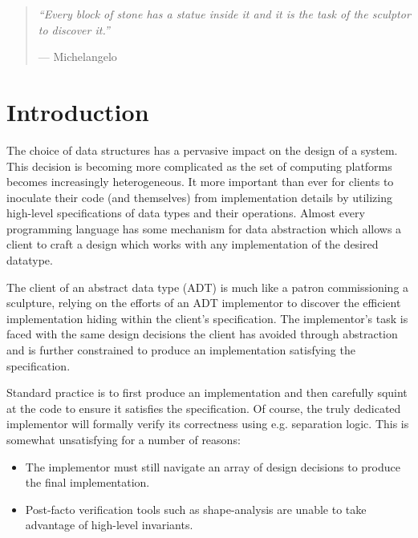 \begin{quote}
\it
  ``Every block of stone has a statue inside it and it is the task of
  the sculptor to discover it.''

  \par\raggedleft--- \textup{Michelangelo}

\end{quote}

\section{Introduction}

The choice of data structures has a pervasive impact on the design of
a system. This decision is becoming more complicated as the set of
computing platforms becomes increasingly heterogeneous. It more
important than ever for clients to inoculate their code (and
themselves) from implementation details by utilizing high-level
specifications of data types and their operations. Almost every
programming language has some mechanism for data abstraction which
allows a client to craft a design which works with any implementation
of the desired datatype.

The client of an abstract data type (ADT) is much like a patron
commissioning a sculpture, relying on the efforts of an ADT
implementor to discover the efficient implementation hiding within the
client's specification. The implementor's task is faced with the same
design decisions the client has avoided through abstraction and is
further constrained to produce an implementation satisfying the
specification.

Standard practice is to first produce an implementation and then
carefully squint at the code to ensure it satisfies the
specification. Of course, the truly dedicated implementor will
formally verify its correctness using e.g. separation logic. This is
somewhat unsatisfying for a number of reasons:
\begin{itemize}
\item The implementor must still navigate an array of design decisions
  to produce the final implementation.
\item Post-facto verification tools such as shape-analysis are unable
  to take advantage of high-level invariants.
\end{itemize}

